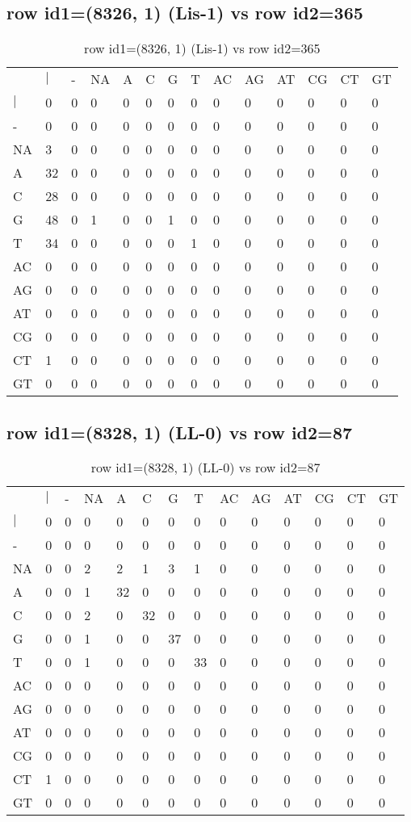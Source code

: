 \subsection{row id1=(8326, 1) (Lis-1) vs row id2=365}
\begin{center}
\begin{longtable}{|l|l|l|l|l|l|l|l|l|l|l|l|l|l|}
\caption{row id1=(8326, 1) (Lis-1) vs row id2=365} \label{table_dm520}\\
\hline
\\
\hline
&$|$&-&NA&A&C&G&T&AC&AG&AT&CG&CT&GT\\
$|$&0&0&0&0&0&0&0&0&0&0&0&0&0\\
-&0&0&0&0&0&0&0&0&0&0&0&0&0\\
NA&3&0&0&0&0&0&0&0&0&0&0&0&0\\
A&32&0&0&0&0&0&0&0&0&0&0&0&0\\
C&28&0&0&0&0&0&0&0&0&0&0&0&0\\
G&48&0&1&0&0&1&0&0&0&0&0&0&0\\
T&34&0&0&0&0&0&1&0&0&0&0&0&0\\
AC&0&0&0&0&0&0&0&0&0&0&0&0&0\\
AG&0&0&0&0&0&0&0&0&0&0&0&0&0\\
AT&0&0&0&0&0&0&0&0&0&0&0&0&0\\
CG&0&0&0&0&0&0&0&0&0&0&0&0&0\\
CT&1&0&0&0&0&0&0&0&0&0&0&0&0\\
GT&0&0&0&0&0&0&0&0&0&0&0&0&0\\
\hline
\end{longtable}
\end{center}

\subsection{row id1=(8328, 1) (LL-0) vs row id2=87}
\begin{center}
\begin{longtable}{|l|l|l|l|l|l|l|l|l|l|l|l|l|l|}
\caption{row id1=(8328, 1) (LL-0) vs row id2=87} \label{table_dm522}\\
\hline
\\
\hline
&$|$&-&NA&A&C&G&T&AC&AG&AT&CG&CT&GT\\
$|$&0&0&0&0&0&0&0&0&0&0&0&0&0\\
-&0&0&0&0&0&0&0&0&0&0&0&0&0\\
NA&0&0&2&2&1&3&1&0&0&0&0&0&0\\
A&0&0&1&32&0&0&0&0&0&0&0&0&0\\
C&0&0&2&0&32&0&0&0&0&0&0&0&0\\
G&0&0&1&0&0&37&0&0&0&0&0&0&0\\
T&0&0&1&0&0&0&33&0&0&0&0&0&0\\
AC&0&0&0&0&0&0&0&0&0&0&0&0&0\\
AG&0&0&0&0&0&0&0&0&0&0&0&0&0\\
AT&0&0&0&0&0&0&0&0&0&0&0&0&0\\
CG&0&0&0&0&0&0&0&0&0&0&0&0&0\\
CT&1&0&0&0&0&0&0&0&0&0&0&0&0\\
GT&0&0&0&0&0&0&0&0&0&0&0&0&0\\
\hline
\end{longtable}
\end{center}

